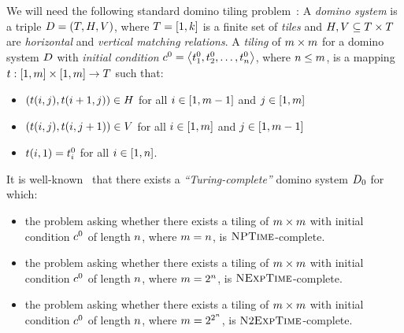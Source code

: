 
We will need the following standard domino tiling
problem~\cite[p. 403]{cervesato2008logic}:
A \emph{domino system} is a triple $D = (T, H, V)$, where
$T = [1,k]$ is a finite set of \emph{tiles} and
$H, V \subseteq {T\times T}$ are \emph{horizontal} and \emph{vertical
matching relations}.
A \emph{tiling} of $m\times m$ for a domino system $D$ with
\emph{initial condition} $c^0 = \left\langle t_{1}^0,t_{2}^0,\dots,t_{n}^0 \right\rangle$,
where $n \leq m$,
is a mapping $t : {[1,m]\times [1,m]} \to T$ such that:
\begin{itemize}
  \item $(t(i,j),t(i+1,j)) \in H$
  for all $i \in [1,m-1]$ and $j \in [1,m]$
  \item $(t(i,j),t(i,j+1)) \in V$
  for all $i \in [1,m]$ and $j \in [1,m-1]$
  \item $t(i, 1) = t_{i}^0$ for all $i \in [1,n]$.
\end{itemize}
It is well-known~\cite{boerger1997classical,van1997convenience} 
that there exists a \emph{``Turing-complete''} domino system $D_0$ for
which:
\begin{itemize}
  \item the problem asking whether there exists a tiling of $m \times m$
  with initial condition $c^0$ of length $n$, where $m = n$,
  is $\text{\normalfont{\scshape NPTime}}$-complete.
  \item the problem asking whether there exists a tiling of $m \times m$
  with initial condition $c^0$ of length $n$, where $m = 2^n$,
  is $\text{\normalfont{\scshape NExpTime}}$-complete.
  \item the problem asking whether there exists a tiling of $m \times m$
  with initial condition $c^0$ of length $n$, where $m = 2^{2^n}$,
  is $\text{\normalfont{\scshape N}}2\text{\normalfont{\scshape ExpTime}}$-complete.
\end{itemize}
